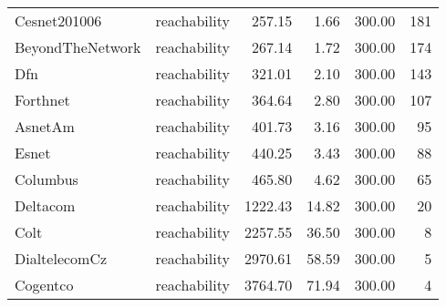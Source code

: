 \begin{tabular}{llrrrr}
Cesnet201006 & reachability & 257.15 & 1.66 & 300.00 & 181 \\
BeyondTheNetwork & reachability & 267.14 & 1.72 & 300.00 & 174 \\
Dfn & reachability & 321.01 & 2.10 & 300.00 & 143 \\
Forthnet & reachability & 364.64 & 2.80 & 300.00 & 107 \\
AsnetAm & reachability & 401.73 & 3.16 & 300.00 & 95 \\
Esnet & reachability & 440.25 & 3.43 & 300.00 & 88 \\
Columbus & reachability & 465.80 & 4.62 & 300.00 & 65 \\
Deltacom & reachability & 1222.43 & 14.82 & 300.00 & 20 \\
Colt & reachability & 2257.55 & 36.50 & 300.00 & 8 \\
DialtelecomCz & reachability & 2970.61 & 58.59 & 300.00 & 5 \\
Cogentco & reachability & 3764.70 & 71.94 & 300.00 & 4 \\
\bottomrule
\end{tabular}
